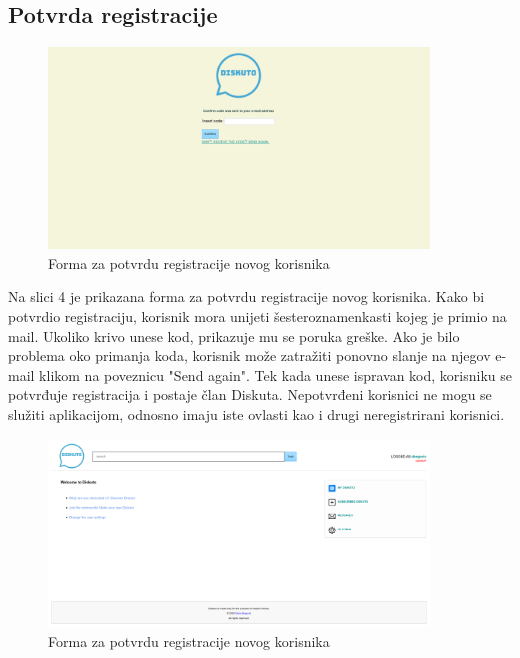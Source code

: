 \documentclass{foi}
\begin{document}
\subsection{Potvrda registracije}

\begin{figure}[h!]
    \centering
    \includegraphics[width=0.9\textwidth]{slike/potvrda-registracije.png}
    \caption{Forma za potvrdu registracije novog korisnika}
\end{figure}

Na slici 4 je prikazana forma za potvrdu registracije novog korisnika. Kako bi potvrdio registraciju, korisnik mora unijeti šesteroznamenkasti kojeg je primio na mail. Ukoliko krivo unese kod, prikazuje mu se poruka greške. Ako je bilo problema oko primanja koda, korisnik može zatražiti ponovno slanje na njegov e-mail klikom na poveznicu "Send again". Tek kada unese ispravan kod, korisniku se potvrđuje registracija i postaje član Diskuta. Nepotvrđeni korisnici ne mogu se služiti aplikacijom, odnosno imaju iste ovlasti kao i drugi neregistrirani korisnici.

\begin{figure}[h!]
    \centering
    \includegraphics[width=0.9\textwidth]{slike/novoregistrirani-pocetna.png}
    \caption{Forma za potvrdu registracije novog korisnika}
\end{figure}
\end{document}
